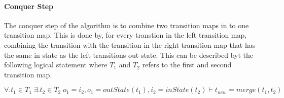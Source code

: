 \paragraph{Conquer Step}
The conquer step of the algorithm is to combine two transition maps in to one
transition map. This is done by, for every transtion in the left transition map, combining
the transition with the transition in the right transition map that has the same in state as the
left transitions out state. This can be described byt the following logical statement where $T_1$ and $T_2$ refers to the first and second transition map.
\begin{center}
$\forall.t_1\in T_1\;\exists.t_2\in T_2\;o_1=i_2,o_1=outState(t_1),i_2=inState(t_2)
\vdash t_{new}=merge(t_1,t_2)$
\end{center}

